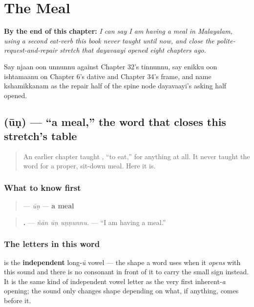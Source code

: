 
\chapter{The Meal}
\label{ch:ml-the-meal}

\begin{chapteropening}
\textbf{By the end of this chapter:} \emph{I can say I am having a meal in Malayalam, using a second eat-verb this book never taught until now, and close the polite-request-and-repair stretch that dayavaayi opened eight chapters ago.}

Say njaan oon unnunnu against Chapter 32's tinnunnu, say enikku oon ishtamaanu on Chapter 6's dative and Chapter 34's frame, and name kshamikkanam as the repair half of the spine node dayavaayi's asking half opened.
\end{chapteropening}

\section[\texorpdfstring{\ml{ഊണ്} (ūṇ)}{ഊണ് (ūṇ)}]{ (ūṇ) — \textquotedblleft{}a meal,\textquotedblright{} the word that closes this stretch's table}

\label{lesson:ML-C40-oon}



\begin{quote}
An earlier chapter taught \textbf{}, \textquotedblleft{}to eat,\textquotedblright{} for anything at all. It never taught the word for a proper, sit-down meal. Here it is.
\end{quote}

\subsection*{What to know first}
\begin{quote}
\textbf{} — \emph{ūṇ} — \textbf{a meal}
\end{quote}

\begin{quote}
\textbf{  .} — \emph{ñān ūṇ uṇṇunnu.} — \textquotedblleft{}I am having a meal.\textquotedblright{}
\end{quote}

\subsection*{The letters in this word}
\textbf{} is the \textbf{independent} long‑\emph{ū} vowel — the shape a word uses when it \emph{opens} with this sound and there is no consonant in front of it to carry the small sign \textbf{} instead. It is the same kind of independent vowel letter as the very first inherent‑\emph{a} opening; the sound only changes shape depending on what, if anything, comes before it.

